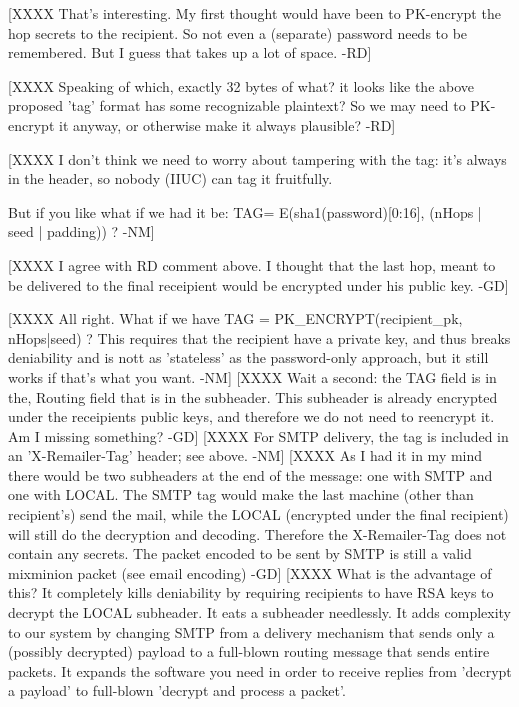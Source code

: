 [XXXX That's interesting. My first thought would have been to PK-encrypt
      the hop secrets to the recipient. So not even a (separate) password
      needs to be remembered. But I guess that takes up a lot of
      space. -RD]

[XXXX Speaking of which, exactly 32 bytes of what? it looks like the
      above proposed 'tag' format has some recognizable plaintext? So
      we may need to PK-encrypt it anyway, or otherwise make it always
      plausible? -RD]

[XXXX I don't think we need to worry about tampering with the tag:
      it's always in the header, so nobody (IIUC) can tag it fruitfully.

      But if you like what if we had it be:
        TAG= E(sha1(password)[0:16],  (nHops | seed | padding)) ? -NM]

[XXXX I agree with RD comment above.  I thought that the last hop, meant
 to be delivered to the final receipient would be encrypted under his public 
 key. -GD]

[XXXX All right.  What if we have 
         TAG = PK_ENCRYPT(recipient_pk, nHops|seed) ?  
      This requires
      that the recipient have a private key, and thus breaks
      deniability and is nott as 'stateless' as the password-only
      approach, but it still works if that's what you want.  -NM]
[XXXX Wait a second: the TAG field is in the, Routing field that is in the 
      subheader. This subheader is already encrypted under the receipients
      public keys, and therefore we do not need to reencrypt it.
      Am I missing something? -GD]
[XXXX For SMTP delivery, the tag is included in an 'X-Remailer-Tag'
      header; see above. -NM]
[XXXX As I had it in my mind there would be two subheaders at the end
         of the message: one with SMTP and one with LOCAL. The SMTP
         tag would make the last machine (other than recipient's) send
         the mail, while the LOCAL (encrypted under the final
         recipient) will still do the decryption and
         decoding. Therefore the X-Remailer-Tag does not contain any
         secrets. The packet encoded to be sent by SMTP is still a
         valid mixminion packet (see email encoding) -GD]
[XXXX What is the advantage of this?  It completely kills deniability
      by requiring recipients to have RSA keys to decrypt the LOCAL
      subheader.  It eats a subheader needlessly.  It adds
      complexity to our system by changing SMTP from a delivery
      mechanism that sends only a (possibly decrypted) payload to a
      full-blown routing message that sends entire packets.  It
      expands the software you need in order to receive replies from
      'decrypt a payload' to full-blown 'decrypt and process a packet'. 

